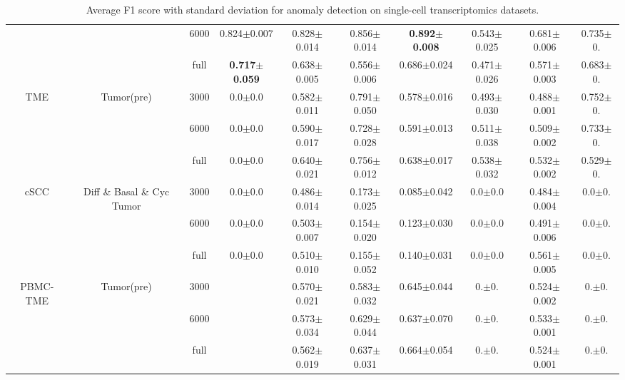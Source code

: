 \documentclass{article}
\begin{document}
\begin{table}
{\begin{tabular}{cccccccccc}
        & & 6000 & 0.824$\pm$0.007 & 0.828$\pm$0.014 & 0.856$\pm$0.014 & \textbf{0.892$\pm$0.008} & 0.543$\pm$0.025 & 0.681$\pm$0.006 & 0.735$\pm$0. \\
        & & full & \textbf{0.717$\pm$0.059} & 0.638$\pm$0.005 & 0.556$\pm$0.006 & 0.686$\pm$0.024 & 0.471$\pm$0.026 & 0.571$\pm$0.003 & 0.683$\pm$0. \\
        \hline
        \multirow{3}{*}{\centering TME} & \multirow{3}{*}{\centering Tumor(pre)} & 3000 & 0.0$\pm$0.0 & 0.582$\pm$0.011 & 0.791$\pm$0.050 & 0.578$\pm$0.016 & 0.493$\pm$0.030 & 0.488$\pm$0.001 & 0.752$\pm$0. \\
        & & 6000 & 0.0$\pm$0.0 & 0.590$\pm$0.017 & 0.728$\pm$0.028 & 0.591$\pm$0.013 & 0.511$\pm$0.038 & 0.509$\pm$0.002 & 0.733$\pm$0. \\
        & & full & 0.0$\pm$0.0 & 0.640$\pm$0.021 & 0.756$\pm$0.012 & 0.638$\pm$0.017 & 0.538$\pm$0.032 & 0.532$\pm$0.002 & 0.529$\pm$0. \\
        \hline
        \multirow{3}{*}{\centering cSCC} & \multirow{3}{*}{\centering Diff \& Basal \& Cyc Tumor} & 3000 & 0.0$\pm$0.0 & 0.486$\pm$0.014 & 0.173$\pm$0.025 & 0.085$\pm$0.042 & 0.0$\pm$0.0 & 0.484$\pm$0.004 & 0.0$\pm$0. \\
        & & 6000 & 0.0$\pm$0.0 & 0.503$\pm$0.007 & 0.154$\pm$0.020 & 0.123$\pm$0.030 & 0.0$\pm$0.0 & 0.491$\pm$0.006 & 0.0$\pm$0. \\
        & & full & 0.0$\pm$0.0 & 0.510$\pm$0.010 & 0.155$\pm$0.052 & 0.140$\pm$0.031 & 0.0$\pm$0.0 & 0.561$\pm$0.005 & 0.0$\pm$0. \\
        \hline
        \multirow{3}{*}{\centering PBMC-TME} & \multirow{3}{*}{\centering Tumor(pre)} & 3000 & & 0.570$\pm$0.021 & 0.583$\pm$0.032 & 0.645$\pm$0.044 & 0.$\pm$0. & 0.524$\pm$0.002 & 0.$\pm$0.  \\
        & & 6000 & & 0.573$\pm$0.034 & 0.629$\pm$0.044 & 0.637$\pm$0.070 & 0.$\pm$0. & 0.533$\pm$0.001 & 0.$\pm$0. \\
        & & full & & 0.562$\pm$0.019 & 0.637$\pm$0.031 & 0.664$\pm$0.054 & 0.$\pm$0. & 0.524$\pm$0.001 & 0.$\pm$0. \\
        \hline
    \end{tabular}
    }
    \caption{Average F1 score with standard deviation for anomaly detection on single-cell transcriptomics datasets.}
    \label{tab:tab2}
\end{table}
\end{document}
